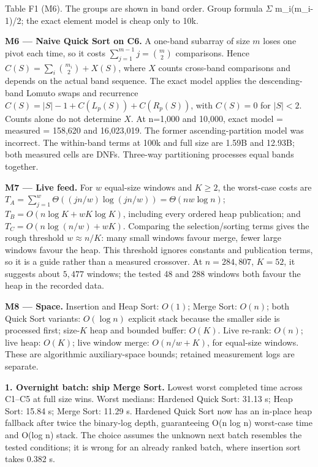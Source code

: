 \documentclass[10pt,a4paper]{article}
\newcommand{\sectiontitle}[1]{\par\vspace{4pt}{\color{teal}\fontsize{12}{14}\selectfont\bfseries #1}\par\vspace{1pt}}
\newcommand{\figcaption}[1]{\par{\fontsize{6.2}{7.1}\selectfont\color{muted}#1}\par\vspace{1pt}}
\begin{document}
\figcaption{Table F1 (M6). The groups are shown in band order. Group formula \(\Sigma\) m\_i(m\_i-1)/2; the exact element model is cheap only to 10k.}

\textbf{M6 --- Naive Quick Sort on C6.}
                    A one-band subarray of size \(m\) loses one pivot each time,
                    so it costs \(\sum_{j=1}^{m-1}j=\binom m2\) comparisons.
                    Hence \(C(S)=\sum_i\binom{m_i}{2}+X(S)\), where \(X\)
                    counts cross-band comparisons and depends on the actual band sequence.
                    The exact model applies the descending-band Lomuto swaps and recurrence
                    \(C(S)=|S|-1+C(L_p(S))+C(R_p(S))\), with \(C(S)=0\) for \(|S|<2\).
                    Counts alone do not determine \(X\). At n=1,000 and 10,000, exact model = measured = 158,620 and 16,023,019. The former ascending-partition model was incorrect. The within-band terms at 100k and full size are 1.59B and 12.93B; both measured cells are DNFs. Three-way partitioning processes equal bands together.\par

\textbf{M7 --- Live feed.} For \(w\) equal-size windows and \(K\geq2\),
    the worst-case costs are
    \(T_A=\sum_{j=1}^{w}\Theta((jn/w)\log(jn/w))=\Theta(nw\log n)\);
    \(T_B=O(n\log K+wK\log K)\), including every ordered heap publication;
    and \(T_C=O(n\log(n/w)+wK)\). Comparing the selection/sorting terms gives
    the rough threshold \(w\approx n/K\): many small windows favour merge,
    fewer large windows favour the heap. This threshold ignores constants and
    publication terms, so it is a guide rather than a measured crossover.
    At \(n=284{,}807\), \(K=52\), it suggests about \(5{,}477\) windows;
    the tested 48 and 288 windows both favour the heap in the recorded data.\par

\textbf{M8 --- Space.} Insertion and Heap Sort: \(O(1)\);
    Merge Sort: \(O(n)\); both Quick Sort variants: \(O(\log n)\) explicit
    stack because the smaller side is processed first; size-\(K\) heap and
    bounded buffer: \(O(K)\). Live re-rank: \(O(n)\);
    live heap: \(O(K)\); live window merge: \(O(n/w+K)\), for equal-size windows.
    These are algorithmic auxiliary-space bounds; retained measurement logs are separate.\par

\sectiontitle{H. Recommendation to the Platform Lead}

\textbf{1. Overnight batch: ship Merge Sort.} Lowest worst completed time across C1--C5 at full size wins. Worst medians: Hardened Quick Sort: 31.13 s; Heap Sort: 15.84 s; Merge Sort: 11.29 s. Hardened Quick Sort now has an in-place heap fallback after twice the binary-log depth, guaranteeing O(n log n) worst-case time and O(log n) stack. The choice assumes the unknown next batch resembles the tested conditions; it is wrong for an already ranked batch, where insertion sort takes 0.382 s.\par
\end{document}
